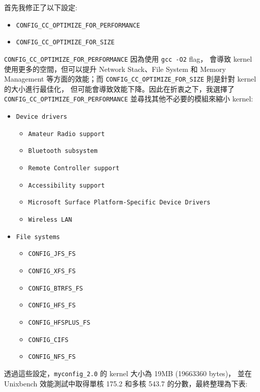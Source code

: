 \documentclass[a4paper, oneside, final, 12pt]{scrartcl} %
\begin{document}
首先我修正了以下設定:

\begin{itemize}
  \item \lstinline{CONFIG_CC_OPTIMIZE_FOR_PERFORMANCE}
  \item \lstinline{CONFIG_CC_OPTIMIZE_FOR_SIZE}
\end{itemize}

\lstinline{CONFIG_CC_OPTIMIZE_FOR_PERFORMANCE} 因為使用 \lstinline{gcc -O2} flag，
會導致 kernel 使用更多的空間，但可以提升 Network Stack、File System 和 Memory Management 
等方面的效能；而 \lstinline{CONFIG_CC_OPTIMIZE_FOR_SIZE} 則是針對 kernel 的大小進行最佳化，
但可能會導致效能下降。因此在折衷之下，我選擇了 \lstinline{CONFIG_CC_OPTIMIZE_FOR_PERFORMANCE}
並尋找其他不必要的模組來縮小 kernel:

\begin{itemize}
  \item \lstinline{Device drivers}
  \begin{itemize}
    \item \lstinline{Amateur Radio support}
    \item \lstinline{Bluetooth subsystem}
    \item \lstinline{Remote Controller support}
    \item \lstinline{Accessibility support}
    \item \lstinline{Microsoft Surface Platform-Specific Device Drivers}
    \item \lstinline{Wireless LAN}
  \end{itemize}
  \item \lstinline{File systems}
  \begin{itemize}
    \item \lstinline{CONFIG_JFS_FS}
    \item \lstinline{CONFIG_XFS_FS}
    \item \lstinline{CONFIG_BTRFS_FS}
    \item \lstinline{CONFIG_HFS_FS}
    \item \lstinline{CONFIG_HFSPLUS_FS}
    \item \lstinline{CONFIG_CIFS}
    \item \lstinline{CONFIG_NFS_FS}
  \end{itemize}
\end{itemize}

透過這些設定，\lstinline{myconfig_2.0} 的 kernel 大小為 19MB (19663360 bytes)，
並在 Unixbench 效能測試中取得單核 175.2 和多核 543.7 的分數，最終整理為下表:
\end{document}
